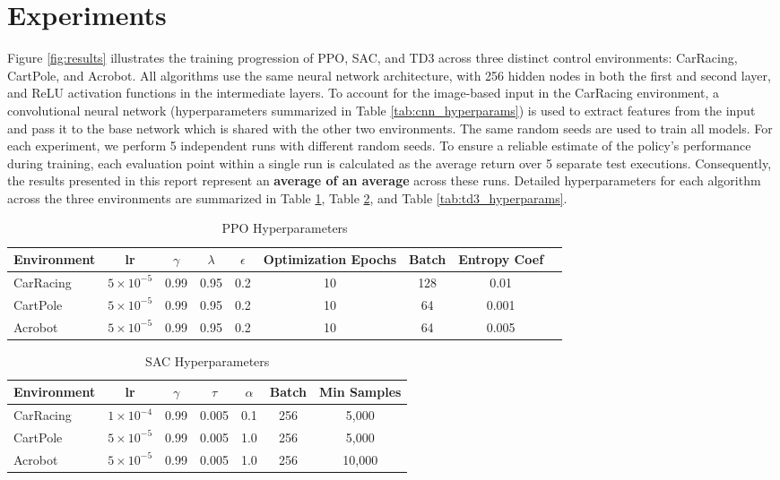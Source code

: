 \documentclass{article}
\begin{document}
\section{Experiments}
Figure \ref{fig:results} illustrates the training progression of PPO, SAC, and TD3 across three distinct control environments: CarRacing, CartPole, and Acrobot. All algorithms use the same neural network architecture, with 256 hidden nodes in both the first and second layer, and ReLU activation functions in the intermediate layers. To account for the image-based input in the CarRacing environment, a convolutional neural network (hyperparameters summarized in Table \ref{tab:cnn_hyperparams}) is used to extract features from the input and pass it to the base network which is shared with the other two environments. The same random seeds are used to train all models. For each experiment, we perform 5 independent runs with different random seeds. To ensure a reliable estimate of the policy's performance during training, each evaluation point within a single run is calculated as the average return over 5 separate test executions. Consequently, the results presented in this report represent an \textbf{average of an average} across these runs. Detailed hyperparameters for each algorithm across the three environments are summarized in Table \ref{tab:ppo_hyperparams}, Table \ref{tab:sac_hyperparams}, and Table \ref{tab:td3_hyperparams}.

\begin{table}[!htb]
  \centering
  \caption{PPO Hyperparameters}
  \label{tab:ppo_hyperparams}
  \begin{tabular}{lcccccccc}
    \hline
    \textbf{Environment} & \textbf{lr} & $\gamma$ & $\lambda$ & $\epsilon$ & \textbf{Optimization Epochs} & \textbf{Batch} & \textbf{Entropy Coef} \\
    \hline
    CarRacing & $5 \times 10^{-5}$ & 0.99 & 0.95 & 0.2 & 10 & 128 & 0.01 \\
    CartPole & $5 \times 10^{-5}$ & 0.99 & 0.95 & 0.2 & 10 & 64 & 0.001 \\
    Acrobot & $5 \times 10^{-5}$ & 0.99 & 0.95 & 0.2 & 10 & 64 & 0.005 \\
    \hline
  \end{tabular}
\end{table}

\begin{table}[!htb]
  \centering
  \caption{SAC Hyperparameters}
  \label{tab:sac_hyperparams}
  \begin{tabular}{lcccccc}
    \hline
    \textbf{Environment} & \textbf{lr} & $\gamma$ & $\tau$ & $\alpha$ & \textbf{Batch} & \textbf{Min Samples} \\
    \hline
    CarRacing & $1 \times 10^{-4}$ & 0.99 & 0.005 & 0.1 & 256 & 5,000 \\
    CartPole & $5 \times 10^{-5}$ & 0.99 & 0.005 & 1.0 & 256 & 5,000 \\
    Acrobot & $5 \times 10^{-5}$ & 0.99 & 0.005 & 1.0 & 256 & 10,000 \\
    \hline
  \end{tabular}
\end{table}
\end{document}
